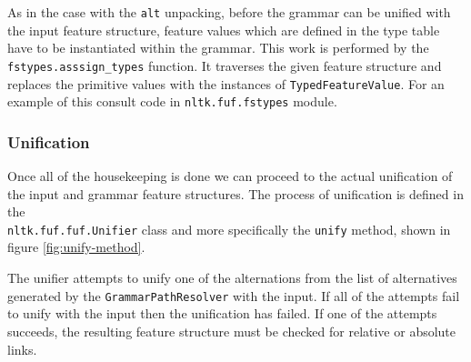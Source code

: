 \documentclass[12pt]{article}
\begin{document}
{As in the case with the \texttt{alt} unpacking, before the grammar can be unified with the input feature structure, 
feature values which are defined in the type table have to be instantiated within the grammar. 
This work is performed by the 
\texttt{fstypes.asssign\_types} function. It traverses the given feature structure and replaces 
the primitive values with the instances of \texttt{TypedFeatureValue}. For an example of this consult
code in \texttt{nltk.fuf.fstypes} module.

\subsubsection{Unification}
\label{sec:unification}
Once all of the housekeeping is done we can proceed to the actual unification of the input and grammar 
feature structures. The process of unification is defined in the \\ 
\texttt{nltk.fuf.fuf.Unifier} class and more
specifically the \texttt{unify} method, shown in figure \ref{fig:unify-method}.

The unifier attempts to unify one of the alternations from the list of alternatives generated by the 
\texttt{GrammarPathResolver} with the input. If all of the attempts fail to unify with the input 
then the unification has failed. If one of the attempts succeeds, the resulting feature structure
must be  checked for relative or absolute links.

}
\end{document}

